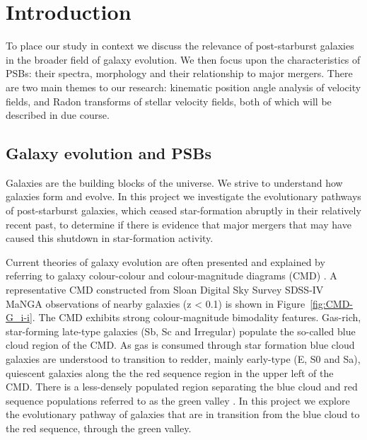 \section{Introduction}
\label{sec:introduction}
To place our study in context we discuss the relevance of post-starburst galaxies in the broader field of galaxy evolution. We then focus upon the characteristics of PSBs: their spectra, morphology and their relationship to major mergers. There are two main themes to our research: kinematic position angle analysis of velocity fields, and Radon transforms of stellar velocity fields, both of which will be described in due course.

\subsection{Galaxy evolution and PSBs}
\label{sec:evolution}
Galaxies are the building blocks of the universe. We strive to understand how galaxies form and evolve. In this project we investigate the evolutionary pathways of  post-starburst galaxies, which ceased star-formation abruptly in their relatively recent past, to determine if there is evidence that major mergers that may have caused this shutdown in star-formation activity.

Current theories of galaxy evolution are often presented and explained  by referring to galaxy colour-colour and colour-magnitude diagrams (CMD) \citep[see e.g.][]{2001AJ....122.1861S, 2003ApJ...585L...5H, 2003ApJS..149..289B,baldry2004quantifying,2006MNRAS.373..469B}. A representative CMD constructed from Sloan Digital Sky Survey SDSS-IV MaNGA observations of nearby galaxies (z < 0.1) is shown in  Figure~\ref{fig:CMD-G_i-i}. The CMD exhibits strong colour-magnitude bimodality features.  Gas-rich, star-forming late-type galaxies (Sb, Sc and Irregular) populate the so-called blue cloud region of the CMD. As gas is consumed through star formation blue cloud galaxies are understood to transition to redder, mainly early-type (E, S0 and Sa), quiescent galaxies along the the red sequence region in the upper left of the CMD. There is a less-densely populated region separating the blue cloud and red sequence populations referred to as the green valley \citep{2004ApJ...608..752B}. In this project we explore the evolutionary pathway of galaxies that are in transition from the blue cloud to the red sequence, through the green valley.

